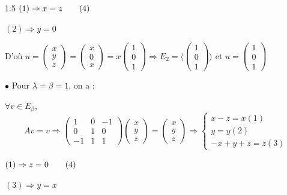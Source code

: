 \documentclass[12pt]{article}
\begin{document}
\begin{spacing}{1.5}
$(1)\Rightarrow x=z \hspace{0.7cm} (4)$

$(2)\Rightarrow y=0$

D'où $u=\begin{pmatrix}
x\\
y\\
z
\end{pmatrix}=\begin{pmatrix}
x\\
0\\
x
\end{pmatrix}=x\begin{pmatrix}
1\\
0\\
1
\end{pmatrix}\Rightarrow E_2=\langle \begin{pmatrix}
1\\
0\\
1
\end{pmatrix}\rangle$ et $u=\begin{pmatrix}
1\\
0\\
1
\end{pmatrix}$

\medskip
$\bullet$ Pour $\lambda=\beta=1$, on a :

$\forall v\in E_\beta$, \[Av=v\Rightarrow \begin{pmatrix}
1 & 0 & -1\\
0 & 1 & 0\\
-1 & 1 & 1
\end{pmatrix}\begin{pmatrix}
x\\
y\\
z
\end{pmatrix}=\begin{pmatrix}
x\\
y\\
z
\end{pmatrix}\Rightarrow \begin{cases}
x-z=x(1)\\
y=y(2)\\
-x+y+z=z(3)
\end{cases}\]

$(1)\Rightarrow z=0 \hspace{0.7cm} (4)$

$(3)\Rightarrow y=x$


\end{spacing}
\end{document}
